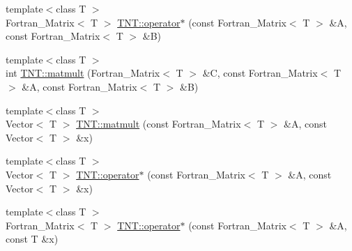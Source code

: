 \begin{DoxyCompactItemize}
\item 
{\footnotesize template$<$class T $>$ }\\Fortran\_\-Matrix$<$ T $>$ \hyperlink{namespace_t_n_t_a4c9b0c32113febe2f6331b888a9eea88}{TNT::operator$\ast$} (const Fortran\_\-Matrix$<$ T $>$ \&A, const Fortran\_\-Matrix$<$ T $>$ \&B)
\item 
{\footnotesize template$<$class T $>$ }\\int \hyperlink{namespace_t_n_t_a603d46a16ecb0ccccaac5909d63f1e2d}{TNT::matmult} (Fortran\_\-Matrix$<$ T $>$ \&C, const Fortran\_\-Matrix$<$ T $>$ \&A, const Fortran\_\-Matrix$<$ T $>$ \&B)
\item 
{\footnotesize template$<$class T $>$ }\\Vector$<$ T $>$ \hyperlink{namespace_t_n_t_abfedcbc5eb6e7f5fe9389fa06db6a588}{TNT::matmult} (const Fortran\_\-Matrix$<$ T $>$ \&A, const Vector$<$ T $>$ \&x)
\item 
{\footnotesize template$<$class T $>$ }\\Vector$<$ T $>$ \hyperlink{namespace_t_n_t_aac8a2989bb0283dc4d0ccf3fe883f8be}{TNT::operator$\ast$} (const Fortran\_\-Matrix$<$ T $>$ \&A, const Vector$<$ T $>$ \&x)
\item 
{\footnotesize template$<$class T $>$ }\\Fortran\_\-Matrix$<$ T $>$ \hyperlink{namespace_t_n_t_a7612f5b6ad37e9a0537ddfcaa738b64a}{TNT::operator$\ast$} (const Fortran\_\-Matrix$<$ T $>$ \&A, const T \&x)
\end{DoxyCompactItemize}
